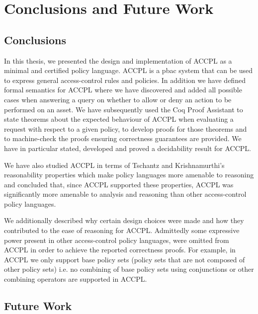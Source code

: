 \chapter{Conclusions and Future Work}

\section{Conclusions}

In this thesis, we presented the design and implementation of \ac{ACCPL} as a minimal and certified policy language. \ac{ACCPL} is a \ac{pbac} system that can be used to express general access-control rules and policies. In addition we have defined formal semantics for \ac{ACCPL} where we have discovered and added all possible cases when answering a query on whether to allow or deny an action to be performed on an asset. We have subsequently used the Coq Proof Assistant to state theorems about the expected behaviour of \ac{ACCPL} when evaluating a request with respect to a given policy, to develop proofs for those theorems and to machine-check the proofs ensuring correctness guarantees are provided. We have in particular stated, developed and proved a decidability result for \ac{ACCPL}. 

We have also studied \ac{ACCPL} in terms of Tschantz and Krishnamurthi's~\cite{Tschantz} reasonability properties which make policy languages more amenable to reasoning and concluded that, since \ac{ACCPL} supported these properties, \ac{ACCPL} was significantly more amenable to analysis and reasoning than other access-control policy languages. 

We additionally described why certain design choices were made and how they contributed to the ease of reasoning for \ac{ACCPL}. Admittedly some expressive power present in other access-control policy languages, were omitted from \ac{ACCPL} in order to achieve the reported correctness proofs. For example, in \ac{ACCPL} we only support base policy sets (policy sets that are not composed of other policy sets) i.e. no combining of base policy sets using conjunctions or other combining operators are supported in \ac{ACCPL}. 


\section{Future Work}

